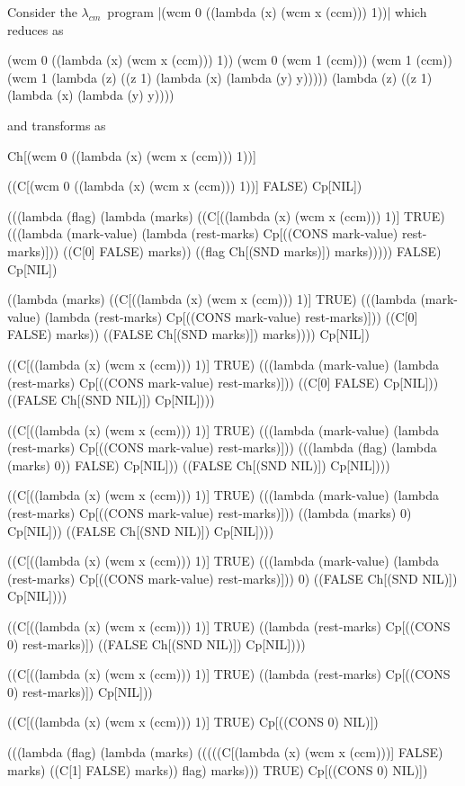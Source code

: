 \documentclass{llncs}
\newcommand{\cm}[0]{$\lambda_{cm}$}
\begin{document}
Consider the \cm\ program \scheme|(wcm 0 ((lambda (x) (wcm x (ccm))) 1))| which reduces as
\begin{schemedisplay}
(wcm 0 ((lambda (x) (wcm x (ccm))) 1))
(wcm 0 (wcm 1 (ccm)))
(wcm 1 (ccm))
(wcm 1 (lambda (z) ((z 1) (lambda (x) (lambda (y) y)))))
(lambda (z) ((z 1) (lambda (x) (lambda (y) y))))
\end{schemedisplay}
and transforms as
\begin{schemedisplay}
Ch[(wcm 0 ((lambda (x) (wcm x (ccm))) 1))]

((C[(wcm 0 ((lambda (x) (wcm x (ccm))) 1))] FALSE) Cp[NIL])

(((lambda (flag)
    (lambda (marks)
      ((C[((lambda (x) (wcm x (ccm))) 1)] TRUE)
       (((lambda (mark-value) (lambda (rest-marks) Cp[((CONS mark-value) rest-marks)]))
         ((C[0] FALSE) marks)) ((flag Ch[(SND marks)]) marks)))))
  FALSE) Cp[NIL])

((lambda (marks)
   ((C[((lambda (x) (wcm x (ccm))) 1)] TRUE)
    (((lambda (mark-value) (lambda (rest-marks) Cp[((CONS mark-value) rest-marks)]))
      ((C[0] FALSE) marks)) ((FALSE Ch[(SND marks)]) marks))))
 Cp[NIL])

((C[((lambda (x) (wcm x (ccm))) 1)] TRUE)
 (((lambda (mark-value) (lambda (rest-marks) Cp[((CONS mark-value) rest-marks)]))
   ((C[0] FALSE) Cp[NIL])) ((FALSE Ch[(SND NIL)]) Cp[NIL])))

((C[((lambda (x) (wcm x (ccm))) 1)] TRUE)
 (((lambda (mark-value) (lambda (rest-marks) Cp[((CONS mark-value) rest-marks)]))
   (((lambda (flag) (lambda (marks) 0)) FALSE) Cp[NIL])) ((FALSE Ch[(SND NIL)]) Cp[NIL])))

((C[((lambda (x) (wcm x (ccm))) 1)] TRUE)
 (((lambda (mark-value) (lambda (rest-marks) Cp[((CONS mark-value) rest-marks)]))
   ((lambda (marks) 0) Cp[NIL])) ((FALSE Ch[(SND NIL)]) Cp[NIL])))

((C[((lambda (x) (wcm x (ccm))) 1)] TRUE)
 (((lambda (mark-value) (lambda (rest-marks) Cp[((CONS mark-value) rest-marks)]))
   0) ((FALSE Ch[(SND NIL)]) Cp[NIL])))

((C[((lambda (x) (wcm x (ccm))) 1)] TRUE)
 ((lambda (rest-marks) Cp[((CONS 0) rest-marks)])
  ((FALSE Ch[(SND NIL)]) Cp[NIL])))

((C[((lambda (x) (wcm x (ccm))) 1)] TRUE)
 ((lambda (rest-marks) Cp[((CONS 0) rest-marks)])
  Cp[NIL]))

((C[((lambda (x) (wcm x (ccm))) 1)] TRUE) Cp[((CONS 0) NIL)])

(((lambda (flag)
    (lambda (marks)
      (((((C[(lambda (x) (wcm x (ccm)))] FALSE) marks)
         ((C[1] FALSE) marks))
        flag)
       marks))) TRUE) Cp[((CONS 0) NIL)])


\end{schemedisplay}
\end{document}
